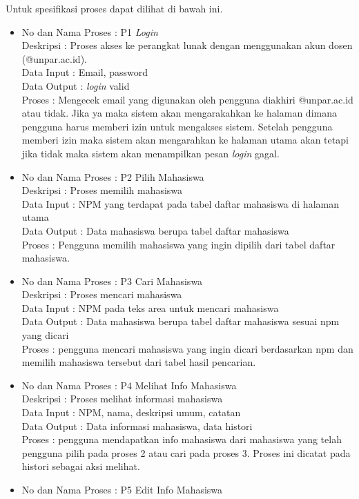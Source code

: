 \begin{enumerate}[(1)]
Untuk spesifikasi proses dapat dilihat di bawah ini.
\begin{itemize}
\item No dan Nama Proses : P1 {\it Login}\\
Deskripsi : Proses akses ke perangkat lunak dengan menggunakan akun dosen (@unpar.ac.id).\\
Data Input : Email, password\\
Data Output : {\it login} valid\\
Proses : Mengecek email yang digunakan oleh pengguna diakhiri @unpar.ac.id atau tidak. Jika ya maka sistem akan mengarakahkan ke halaman dimana pengguna harus memberi izin untuk mengakses sistem. Setelah pengguna memberi izin maka sistem akan mengarahkan ke halaman utama akan tetapi jika tidak maka sistem akan menampilkan pesan {\it login} gagal.
\item No dan Nama Proses : P2 Pilih Mahasiswa\\
Deskripsi : Proses memilih mahasiswa\\
Data Input : NPM yang terdapat pada tabel daftar mahasiswa di halaman utama\\
Data Output : Data mahasiswa berupa tabel daftar mahasiswa\\
Proses : Pengguna memilih mahasiswa yang ingin dipilih dari tabel daftar mahasiswa.
\item No dan Nama Proses : P3 Cari Mahasiswa\\
Deskripsi : Proses mencari mahasiswa\\
Data Input : NPM pada teks area untuk mencari mahasiswa\\
Data Output : Data mahasiswa berupa tabel daftar mahasiswa sesuai npm yang dicari\\
Proses : pengguna mencari mahasiswa yang ingin dicari berdasarkan npm dan memilih mahasiswa tersebut dari tabel hasil pencarian.
\item No dan Nama Proses : P4 Melihat Info Mahasiswa\\
Deskripsi : Proses melihat informasi mahasiswa\\
Data Input : NPM, nama, deskripsi umum, catatan\\
Data Output : Data informasi mahasiswa, data histori\\
Proses : pengguna mendapatkan info mahasiswa dari mahasiswa yang telah pengguna pilih pada proses 2 atau cari pada proses 3. Proses ini dicatat pada histori sebagai aksi melihat.
\item No dan Nama Proses : P5 Edit Info Mahasiswa\\

\end{itemize}
\end{enumerate}
